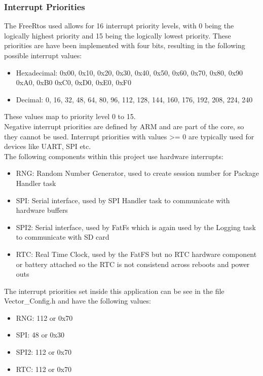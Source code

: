 \subsubsection{Interrupt Priorities}
The FreeRtos used allows for 16 interrupt priority levels, with 0 being the logically highest priority and 15 being the logically lowest priority. These priorities are have been implemented with four bits, resulting in the following possible interrupt values:
\begin{itemize}
    \item Hexadecimal: 0x00, 0x10, 0x20, 0x30, 0x40, 0x50, 0x60, 0x70, 0x80, 0x90 0xA0, 0xB0 0xC0, 0xD0, 0xE0, 0xF0
    \item Decimal: 0, 16, 32, 48, 64, 80, 96, 112, 128, 144, 160, 176, 192, 208, 224, 240
\end{itemize}
These values map to priority level 0 to 15.\\
Negative interrupt priorities are defined by ARM and are part of the core, so they cannot be used. Interrupt priorities with values >= 0 are typically used for devices like UART, SPI etc.\\
The following components within this project use hardware interrupts:
\begin{itemize}
    \item RNG: Random Number Generator, used to create session number for Package Handler task
    \item SPI: Serial interface, used by SPI Handler task to communicate with hardware buffers
    \item SPI2: Serial interface, used by FatFs which is again used by the Logging task to communicate with SD card 
    \item RTC: Real Time Clock, used by the FatFS but no RTC hardware component or battery attached so the RTC is not consistend across reboots and power outs
\end{itemize}
The interrupt priorities set inside this application can be see in the file Vector\_Config.h and have the following values:
\begin{itemize}
    \item RNG: 112 or 0x70
    \item SPI: 48 or 0x30
    \item SPI2: 112 or 0x70
    \item RTC: 112 or 0x70
\end{itemize}
%

